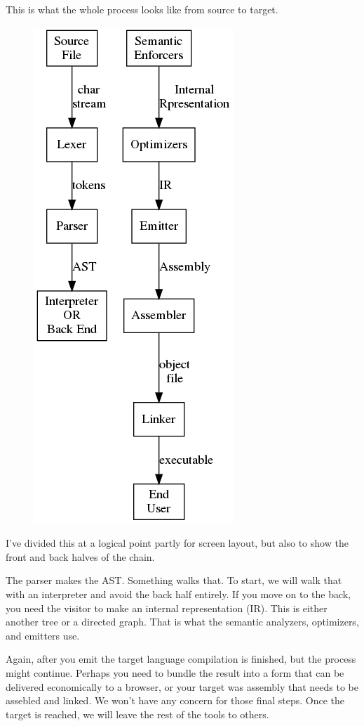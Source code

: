 This is what the whole process looks like from source to target.

\begin{figure}
\centering
\includegraphics[scale=0.70]{compilationsteps.png}
\end{figure}

I've divided this at a logical point partly for screen layout,
but also to show the front and back halves of the chain.

The parser makes the AST. Something walks that. To start, we will
walk that with an interpreter and avoid the back half entirely.
If you move on to the back, you need the visitor to make an internal
representation (IR). This is either another tree or a directed graph.
That is what the semantic analyzers, optimizers, and emitters use.

Again, after you emit the target language compilation is finished,
but the process might continue. Perhaps you need to bundle the result
into a form that can be delivered economically to a browser, or your
target was assembly that needs to be assebled and linked. We won't
have any concern for those final steps. Once the target is reached,
we will leave the rest of the tools to others.

